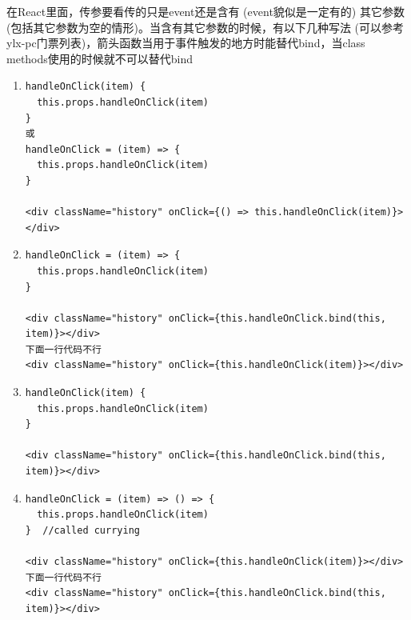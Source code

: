 \documentclass[a4paper, 12pt]{article}
\begin{document}
在React里面，传参要看传的只是event{\color{red}还是含有} (event貌似是一定有的) 其它参数 (包括其它参数为空的情形)。当含有其它参数的时候，有以下几种写法 (可以参考ylx-pc门票列表)，箭头函数当用于事件触发的地方时能替代bind，当class methods使用的时候就{\color{red}不}可以替代bind
\begin{enumerate}
\item \begin{verbatim}
handleOnClick(item) {
  this.props.handleOnClick(item)
}
或
handleOnClick = (item) => {
  this.props.handleOnClick(item)
}

<div className="history" onClick={() => this.handleOnClick(item)}></div>
\end{verbatim}

\item \begin{verbatim}
handleOnClick = (item) => {
  this.props.handleOnClick(item)
}

<div className="history" onClick={this.handleOnClick.bind(this, item)}></div>
下面一行代码不行
<div className="history" onClick={this.handleOnClick(item)}></div>
\end{verbatim}

\item \begin{verbatim}
handleOnClick(item) {
  this.props.handleOnClick(item)
}

<div className="history" onClick={this.handleOnClick.bind(this, item)}></div>
\end{verbatim}

\item \begin{verbatim}
handleOnClick = (item) => () => {
  this.props.handleOnClick(item)
}  //called currying

<div className="history" onClick={this.handleOnClick(item)}></div>
下面一行代码不行
<div className="history" onClick={this.handleOnClick.bind(this, item)}></div>
\end{verbatim}
\end{enumerate}
\end{document}
